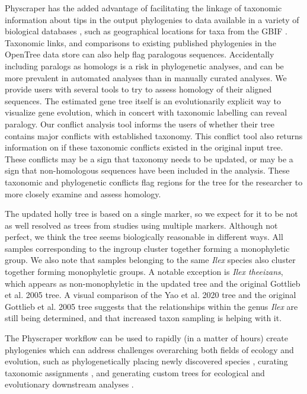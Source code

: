 \documentclass{bmcart}
\begin{document}
Physcraper has the added advantage of facilitating the linkage of taxonomic information about tips
in the output phylogenies to data available in a variety of biological databases
\cite{rees2017automated}, such as
geographical locations for taxa from the GBIF \cite{gbif_secretariat_gbif_2019}.
Taxonomic links, and comparisons to existing published phylogenies in the OpenTree data store can also help flag paralogous sequences.
Accidentally including paralogs as homologs is a risk in phylogenetic analyses, and can be more prevalent in automated analyses than in manually curated analyses.
We provide users with several tools to try to assess homology of their aligned sequences.
The estimated gene tree itself is an evolutionarily explicit way to visualize gene evolution, which in concert with taxonomic labelling can reveal paralogy.
Our conflict analysis tool informs the users of whether their tree contains major conflicts with established taxonomy.
This conflict tool also returns information on if these taxonomic conflicts existed in the original input tree.
These conflicts may be a sign that taxonomy needs to be updated, or may be a sign that non-homologous sequences have been included in the analysis.
These taxonomic and phylogenetic conflicts flag regions for the tree for the researcher to more closely examine and assess homology.


The updated holly tree is based on a single marker, so we expect for it to be
not as well resolved as trees from studies using multiple markers. Although not perfect,
we think the tree seems biologically reasonable in different ways. All samples
corresponding to the ingroup cluster together forming a monophyletic group. We also
note that samples belonging to the same \textit{Ilex} species also cluster together forming
monophyletic groups. A notable exception is \textit{Ilex theeizans}, which appears as
non-monophyletic in the updated tree and the original Gottlieb et al. 2005 tree.
A visual comparison
of the Yao et al. 2020 tree and the original Gottlieb et al. 2005 tree suggests
that the relationships within the genus \textit{Ilex} are still being determined, and that
increased taxon sampling is helping with it.

The Physcraper workflow can be used to rapidly (in a matter of hours) create
phylogenies which can address challenges overarching both fields of ecology and evolution, such as
phylogenetically placing newly discovered species \cite{webb2010biodiversity},
curating taxonomic assignments
\cite{san2010molecular},
and generating custom trees for ecological \cite{helmus2012phylogenetic} and
evolutionary downstream analyses \cite{stoltzfus2013phylotastic}.
\end{document}
